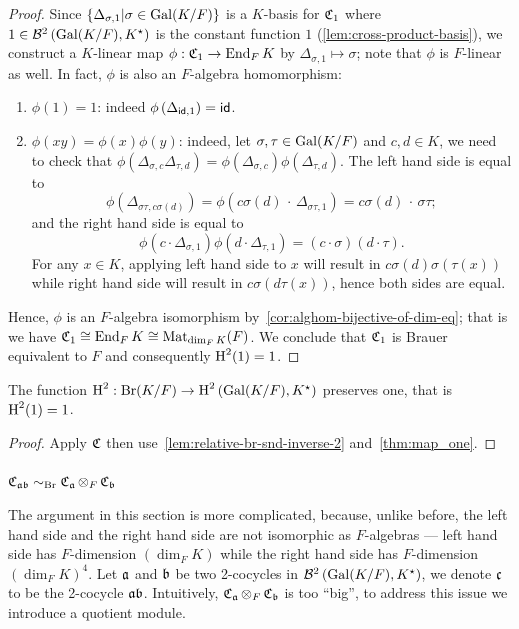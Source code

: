 \begin{proof}
  Since $\{\Delta_{\sigma, 1}|\sigma\in\operatorname{Gal}(K/F)\}$ is a $K$-basis for $\operatorname{\mathfrak{C}}_{1}$ where $1 \in \mathcal{B}^{2}\left(\operatorname{Gal}(K/F),K^{\star}\right)$ is the constant function $1$ (\cref{lem:cross-product-basis}), we construct a $K$-linear map $\phi : \operatorname{\mathfrak{C}}_{1} \to \operatorname{End}_{F} K$ by $\Delta_{\sigma, 1} \mapsto \sigma$; note that $\phi$ is $F$-linear as well. In fact, $\phi$ is also an $F$-algebra homomorphism:
  \begin{enumerate}
    \item $\phi(1) = 1$: indeed $\phi\left(\Delta_{\mathsf{id},1}\right) = \mathsf{id}$.
    \item $\phi(xy) = \phi(x)\phi(y)$: indeed, let $\sigma,\tau\in\operatorname{Gal}(K/F)$ and $c,d\in K$, we need to check that $\phi\left(\Delta_{\sigma,c}\Delta_{\tau,d}\right) = \phi\left(\Delta_{\sigma,c}\right)\phi\left(\Delta_{\tau,d}\right)$. The left hand side is equal to
          \[\phi\left(\Delta_{\sigma\tau,c\sigma(d)}\right) = \phi\left(c\sigma(d)\,\cdot\, \Delta_{\sigma\tau,1}\right) = c\sigma(d)\,\cdot\, \sigma\tau;\]
          and the right hand side is equal to
          \[
        \phi\left(c\cdot \Delta_{\sigma,1}\right)\phi\left(d\cdot \Delta_{\tau, 1}\right) = (c \cdot \sigma) (d \cdot \tau).
          \]
          For any $x \in K$, applying left hand side to $x$ will result in $c\sigma(d)\sigma(\tau(x))$ while right hand side will result in $c\sigma(d\tau(x))$, hence both sides are equal.
  \end{enumerate}
  Hence, $\phi$ is an $F$-algebra isomorphism by~\cref{cor:alghom-bijective-of-dim-eq}; that is we have $\operatorname{\mathfrak{C}}_{1} \cong \operatorname{End}_{F}K \cong\operatorname{Mat}_{\dim_{F}K}(F)$. We conclude that $\operatorname{\mathfrak{C}}_{1}$ is Brauer equivalent to $F$ and consequently $\operatorname{H}^{2}(1) = 1$.
\end{proof}


\begin{corollary}
  The function $\operatorname{H}^{2}:\operatorname{Br}(K/F) \to \operatorname{H}^{2}\left(\operatorname{Gal}(K/F), K^{\star}\right)$ preserves one, that is $\operatorname{H}^{2}(1) = 1$.
  \leanok
\end{corollary}
\begin{proof}
  Apply $\operatorname{\mathfrak{C}}$ then use~\cref{lem:relative-br-snd-inverse-2} and~\cref{thm:map_one}.
\end{proof}

\subsubsection{$\operatorname{\mathfrak{C}}_{\mathfrak{a}\mathfrak{b}}\sim_{\operatorname{Br}}\operatorname{\mathfrak{C}}_{\mathfrak{a}}\otimes_{F}\operatorname{\mathfrak{C}}_{\mathfrak{b}}$}
The argument in this section is more complicated, because, unlike before, the left hand side and the right hand side are not isomorphic as $F$-algebras --- left hand side has $F$-dimension $\left(\dim_{F}K\right)$ while the right hand side has $F$-dimension $\left(\dim_{F}K\right)^{4}$. Let $\mathfrak{a}$ and $\mathfrak{b}$ be two 2-cocycles in $\mathcal{B}^{2}\left(\operatorname{Gal}(K/F), K^{\star}\right)$, we denote $\mathfrak{c}$ to be the 2-cocycle $\mathfrak{a} \mathfrak{b}$. Intuitively, $\operatorname{\mathfrak{C}}_{\mathfrak{a}} \otimes_{F} \operatorname{\mathfrak{C}}_{\mathfrak{b}}$ is too ``big'', to address this issue we introduce a quotient module.

